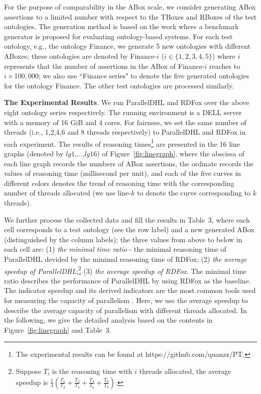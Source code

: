 \documentclass[final,1p,times]{elsarticle}
\begin{document}
For the purpose of comparability in the ABox scale, we consider generating ABox assertions
to a limited number with respect to the TBoxes and RBoxes of the test ontologies.
The generation method is based on the work \cite{Elhaik98} where a benchmark generator is proposed
for evaluating ontology-based systems.
For each test ontology, e.g., the ontology Finance, we generate 5 new ontologies with different ABoxes;
these ontologies are denoted by Finance-$i$ ($i\in\{1,2,3,4,5\}$) where $i$ represents that the number
of assertions in the ABox of Finance-$i$ reaches to $i\times100,000$;
we also use ``Finance series" to denote the five generated ontologies
for the ontology Finance. The other test ontologies are processed similarly.


\textbf{The Experimental Results}.
We run ParallelDHL and RDFox over the above eight ontology series respectively.
The running environment is a DELL server with a
memory of 16 GiB and 4 cores.
For fairness, we set the same number of threads (i.e., 1,2,4,6 and 8 threads respectively)
to ParallelDHL and RDFox in each experiment. The results of reasoning
times\footnote{The experimental results can be found at https://github.com/quanzz/PT.} are
presented in the 16 line graphs (denoted by $lg1$,...,$lg16$) of Figure~\ref{fig:linegraph},
where the abscissa of each line graph records the numbers of ABox assertions,
the ordinate records the values of reasoning time (millisecond per unit),
and each of the five curves in different colors denotes the trend of reasoning time with the
corresponding number of threads allocated (we use line-$k$ to denote the curve
corresponding to $k$ threads).

We further process the collected data and fill the results in Table~3, where each cell corresponds
to a test ontology (see the row label) and a new generated ABox (distinguished by the column labels);
the three values from above to below in each cell are: (1) \emph{the minimal time ratio} - the minimal reasoning time
of ParallelDHL devided by the minimal reasoning time of RDFox;
(2) \emph{the average speedup of ParallelDHL};\footnote{Suppose $T_i$ is the reasoning time with $i$ threads allocated,
the average speedup is $\frac{1}{4}(\frac{T_1}{T_2}+\frac{T_2}{T_4}+\frac{T_4}{T_6}+\frac{T_6}{T_8})$.}
(3) \emph{the average speedup of RDFox}.
The minimal time ratio describes the performance of ParallelDHL by using RDFox as the baseline.
The indicator speedup and its derived indicators are the most common tools used for measuring the capacity of parallelism \cite{MotikNPHO14,KazakovKS14,UrbaniKMHB12}.
Here, we use the average speedup \cite{ichiyoshiK92} to describe the average capacity of parallelism with different
threads allocated.
In the following, we give the detailed analysis based on the contents in Figure~\ref{fig:linegraph} and Table~3.
\end{document}
